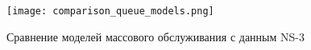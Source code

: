 
\begin{figure}[h!]
  \centering
   \texttt{[image: comparison\_queue\_models.png]}
\caption{Сравнение моделей массового обслуживания с данным NS-3}
\label{fig:comparison_queue_models}
\end{figure}



